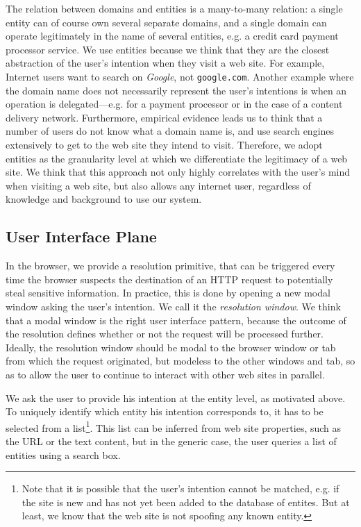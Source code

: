 \documentclass[11pt,styles/chicago,a4paper]{article}
\begin{document}
The relation between domains and entities is a many-to-many relation: a single entity can of course own several separate domains, and a single domain can operate legitimately in the name of several entities, e.g. a credit card payment processor service. We use entities because we think that they are the closest abstraction of the user's intention when they visit a web site. For example, Internet users want to search on \emph{Google}, not \texttt{google.com}. Another example where the domain name does not necessarily represent the user's intentions is when an operation is delegated---e.g. for a payment processor or in the case of a content delivery network. Furthermore, empirical evidence \cite{facebooklogin} leads us to think that a number of users do not know what a domain name is, and use search engines extensively to get to the web site they intend to visit. Therefore, we adopt entities as the granularity level at which we differentiate the legitimacy of a web site. We think that this approach not only highly correlates with the user's mind when visiting a web site, but also allows any internet user, regardless of knowledge and background to use our system. %

\subsection{User Interface Plane}

In the browser, we provide a resolution primitive, that can be triggered every time the browser suspects the destination of an HTTP request to potentially steal sensitive information. In practice, this is done by opening a new modal window asking the user's intention. We call it the \emph{resolution window}. We think that a modal window is the right user interface pattern, because the outcome of the resolution defines whether or not the request will be processed further. Ideally, the resolution window should be modal to the browser window or tab from which the request originated, but modeless to the other windows and tab, so as to allow the user to continue to interact with other web sites in parallel.

We ask the user to provide his intention at the entity level, as motivated above. To uniquely identify which entity his intention corresponds to, it has to be selected from a list\footnote{Note that it is possible that the user's intention cannot be matched, e.g. if the site is new and has not yet been added to the database of entites. But at least, we know that the web site is not spoofing any known entity.}. This list can be inferred from web site properties, such as the URL or the text content, but in the generic case, the user queries a list of entities using a search box.
\end{document}
